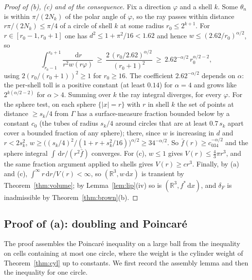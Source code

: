 \documentclass[11pt]{amsart}
\newcommand{\R}{\mathbb{R}}
\newcommand{\dd}{\,\mathrm{d}}
\newcommand{\abs}[1]{\lvert #1\rvert}
\newcommand{\fbar}{\bar f}
\theoremstyle{plain}
\theoremstyle{definition}
\theoremstyle{remark}
\begin{document}
\begin{proof}[Proof of (b), (c) and of the consequence]
Fix a direction $\varphi$ and a shell $k$. Some $\theta_n$ is within
$\pi/(2N_k)$ of the polar angle of $\varphi$, so the ray passes within
distance $r\pi/(2N_k)\le\pi/4$ of a circle of shell $k$ at some radius
$r_0\le2^{k+1}$. For $r\in[r_0-1,r_0+1]$ one has $d^2\le1+\pi^2/16<1.62$ and
hence $w\le(2.62/r_0)^{\alpha/2}$, so
\begin{equation}\label{eq:raybound}
\int_{r_0-1}^{r_0+1}\frac{\dd r}{r^2w(r\varphi)}\ \ge\
\frac{2\,(r_0/2.62)^{\alpha/2}}{(r_0+1)^2}\ \ge\ 2.62^{-\alpha/2}\,r_0^{\alpha/2-2},
\end{equation}
using $2(r_0/(r_0+1))^2\ge1$ for $r_0\ge16$. The coefficient $2.62^{-\alpha/2}$
depends on $\alpha$: the per-shell toll is a positive constant (at least $0.14$)
for $\alpha=4$ and grows like $2^{k(\alpha/2-2)}$ for
$\alpha>4$. Summing over $k$ the ray integral diverges, for every $\varphi$. For
the sphere test, on each sphere $\{\abs x=r\}$ with $r$ in shell $k$ the set of
points at distance $\ge s_k/4$ from $\Gamma$ has a surface-measure fraction
bounded below by a constant $c_0$ (the tubes of radius $s_k/4$ around circles
that are at least $0.7\,s_k$ apart cover a bounded fraction of any sphere);
there, since $w$ is increasing in $d$ and $r<2s_k^2$,
$w\ge\bigl((s_k/4)^2/(1+r+s_k^2/16)\bigr)^{\alpha/2}\ge34^{-\alpha/2}$.
So $\fbar(r)\ge c_034^{-\alpha/2}$ and the sphere integral $\int\dd r/(r^2\fbar)$
converges. For (c), $w\le1$ gives $V(r)\le\frac43\pi r^3$, and the same
fraction argument applied to shells gives $V(r)\ge cr^3$. Finally, by (a) and
(c), $\int^\infty r\dd r/V(r)<\infty$, so $(\R^3,w\dd x)$ is transient by
Theorem~\ref{thm:volume}; by Lemma~\ref{lem:lip}(iv) so is
$(\R^3,f^*\dd x)$, and $\delta_F$ is inadmissible by
Theorem~\ref{thm:brown}(b).
\end{proof}

\subsection{Proof of (a): doubling and Poincar\'e}
The proof assembles the Poincar\'e inequality on a large ball from the
inequality on cells containing at most one circle, where the weight is the
cylinder weight of Theorem~\ref{thm:cyl} up to constants. We first record the
assembly lemma and then the inequality for one circle.
\end{document}
